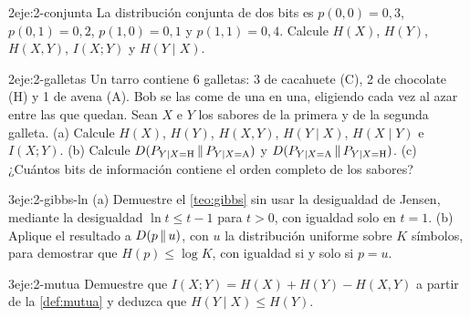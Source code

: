 \begin{ejercicio}{2}{eje:2-conjunta}
La distribución conjunta de dos bits es $p(0,0)=0{,}3$, $p(0,1)=0{,}2$, $p(1,0)=0{,}1$ y $p(1,1)=0{,}4$. Calcule $H(X)$, $H(Y)$, $H(X,Y)$, $I(X;Y)$ y $H(Y\mid X)$.
\end{ejercicio}

\begin{ejercicio}{2}{eje:2-galletas}
Un tarro contiene 6 galletas: 3 de cacahuete (C), 2 de chocolate (H) y 1 de avena (A). Bob se las come de una en una, eligiendo cada vez al azar entre las que quedan. Sean $X$ e $Y$ los sabores de la primera y de la segunda galleta. (a) Calcule $H(X)$, $H(Y)$, $H(X,Y)$, $H(Y\mid X)$, $H(X\mid Y)$ e $I(X;Y)$. (b) Calcule $D(P_{Y\mid X=\mathrm{H}}\,\|\,P_{Y\mid X=\mathrm{A}})$ y $D(P_{Y\mid X=\mathrm{A}}\,\|\,P_{Y\mid X=\mathrm{H}})$. (c) ¿Cuántos bits de información contiene el orden completo de los sabores?
\end{ejercicio}

\begin{ejercicio}{3}{eje:2-gibbs-ln}
(a) Demuestre el \cref{teo:gibbs} sin usar la desigualdad de Jensen, mediante la desigualdad $\ln t\le t-1$ para $t>0$, con igualdad solo en $t=1$. (b) Aplique el resultado a $D(p\,\|\,u)$, con $u$ la distribución uniforme sobre $K$ símbolos, para demostrar que $H(p)\le\log K$, con igualdad si y solo si $p=u$.
\end{ejercicio}

\begin{ejercicio}{3}{eje:2-mutua}
Demuestre que $I(X;Y)=H(X)+H(Y)-H(X,Y)$ a partir de la \cref{def:mutua} y deduzca que $H(Y\mid X)\le H(Y)$.
\end{ejercicio}
